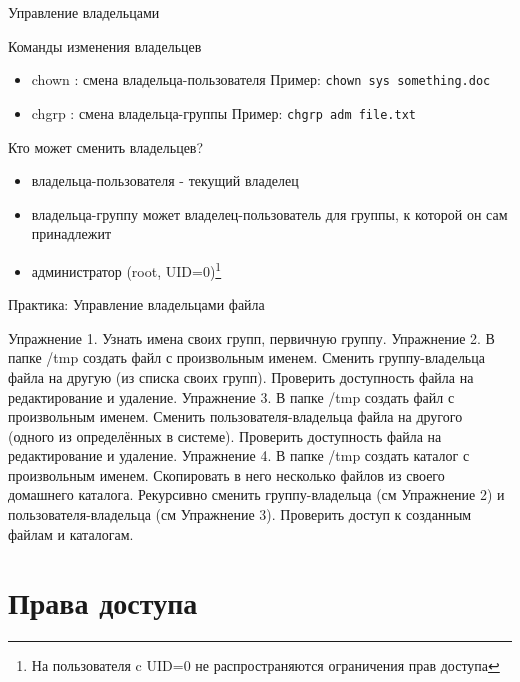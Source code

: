 \begin{frame}[fragile]{Управление владельцами}

  Команды изменения владельцев
  \begin{itemize} 
    \item \alert{chown} : смена владельца-пользователя \newline
      Пример: \verb+chown sys something.doc+
    \item \alert{chgrp} : смена владельца-группы \newline
      Пример: \verb+chgrp adm file.txt+
  \end{itemize} \pause

  Кто может сменить владельцев?
  \begin{itemize}
    \item владельца-пользователя  - текущий владелец
    \item владельца-группу может владелец-пользователь для группы, к которой он сам принадлежит
    \item  администратор (root, UID=0)\footnote{На пользователя c UID=0 не распространяются ограничения прав доступа} 
  \end{itemize} 
\end{frame}

\begin{frame}{Практика: Управление владельцами файла}
  
  \alert{Упражнение 1.} Узнать имена своих групп, первичную группу.\newline
  \alert{Упражнение 2.} В папке /tmp создать файл с произвольным именем. 
  Сменить группу-владельца файла на другую (из списка своих групп). 
  Проверить доступность файла на редактирование и удаление.\newline
  \alert{Упражнение 3.} В папке /tmp создать файл с произвольным именем.
  Сменить пользователя-владельца файла на другого (одного из определённых в системе).  Проверить доступность файла на редактирование и удаление. \newline
  \alert{Упражнение 4.} В папке /tmp создать каталог с произвольным именем. Скопировать в него несколько файлов из своего домашнего каталога. Рекурсивно сменить группу-владельца (см Упражнение 2) и пользователя-владельца (см Упражнение 3). Проверить доступ к созданным файлам и каталогам.

\end{frame}

\section{Права доступа}

